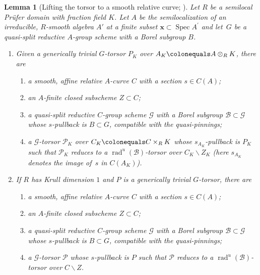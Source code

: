 \documentclass[JEP,XML,SOM,Unicode,published]{cedram}
\let\backslash\smallsetminus
\newcommand{\cP}{\mathcal{P}}
\newcommand{\sB}{\mathscr{B}}
\newcommand{\sG}{\mathscr{G}}
\let\ce\colonequals
\newcommand{\pr}{^{\prime}}
\DeclareMathOperator{\Spec}{Spec}
\DeclareMathOperator{\rad}{rad}
\newcommand{\blemt}{\begin{lemma-tweak}}
\newcommand{\elemt}{\end{lemma-tweak}}
\theoremstyle{plain}
\newtheorem{lemma-tweak}[subsection]{Lemma}
\theoremstyle{definition}
\begin{document}
\blemt [Lifting the torsor to a smooth relative curve; {\cf \cite[Prop.\,4.2]{Ces22a}}]\label{red q-s torsor to rel curve}
Let $R$ be a semilocal Prüfer domain with fraction field $K$.
Let $A$ be the semilocalization of an irreducible, $R$-smooth algebra $A'$ at a finite subset $\textbf{x}\subset \Spec A\pr$ and let~$G$ be a quasi-split reductive $A$-group scheme with a Borel subgroup $B$.
\begin{enumerate}
\item\label{red q-s torsor to rel curve1} Given a generically trivial $G$-torsor $P_K$ over $A_K\ce A\otimes_RK$, there are
\begin{enumerate}\def\theenumii{\roman{enumii}}
\item\label{red q-s torsor to rel curve1i} a smooth, affine relative $A$-curve $C$ with a section $s\in C(A)$;
\item\label{red q-s torsor to rel curve1ii} an $A$-finite closed subscheme $Z\subset C$;
\item\label{red q-s torsor to rel curve1iii} a quasi-split reductive $C$-group scheme $\sG$ with a Borel subgroup $\sB\subset \sG$ whose $s$-pullback is $B\subset G$, compatible with the quasi-pinnings;
\item\label{red q-s torsor to rel curve1iv} a $\sG$-torsor $\cP_K$ over $C_K\ce C\times_RK$ whose $s_{A_K}$-pullback is $P_K$ such that $\cP_K$ reduces to a {$\rad^u(\sB)$}-torsor over $C_K\backslash Z_K$ (here $s_{A_K}$ denotes the image of~$s$ in $C(A_K)$).
\end{enumerate}
\item\label{red q-s torsor to rel curve2} If $R$ has Krull dimension $1$ and $P$ is a generically trivial $G$-torsor, there are
\begin{enumerate}\def\theenumii{\roman{enumii}}
\item\label{red q-s torsor to rel curve2i} a smooth, affine relative $A$-curve $C$ with a section $s\in C(A)$;
\item\label{red q-s torsor to rel curve2ii} an $A$-finite closed subscheme $Z\subset C$;
\item\label{red q-s torsor to rel curve2iii} a quasi-split reductive $C$-group scheme $\sG$ with a Borel subgroup $\sB\subset \sG$ whose $s$-pullback is $B\subset G$, compatible with the quasi-pinnings;
\item\label{red q-s torsor to rel curve2iv} a $\sG$-torsor $\cP$ whose $s$-pullback is $P$ such that $\cP$ reduces to a {$\rad^u(\sB)$}-torsor over $C\backslash Z$.
\end{enumerate}
\end{enumerate}
\elemt
\end{document}
